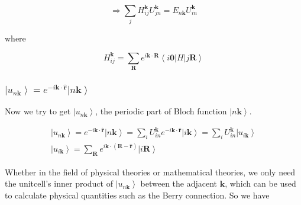 \begin{equation}
  \Rightarrow \sum_{j} H_{ij}^{\boldsymbol{k}} U_{jn}^{\boldsymbol{k}} = E_{n\boldsymbol{k}} U_{in}^{\boldsymbol{k}} 
\end{equation}

\noindent
where

\begin{equation}
  H_{ij}^{\boldsymbol{k}} = \sum_{\boldsymbol{R}} e^{i\boldsymbol{k} \cdot \boldsymbol{R}} \left\langle i \boldsymbol{0} \right| H \left| j \boldsymbol{R} \right\rangle
\end{equation}

\subsubsection{$\left| u_{n\boldsymbol{k}} \right\rangle = e^{-i\boldsymbol{k} \cdot \hat{\boldsymbol{r}}} \left| n\boldsymbol{k} \right\rangle$}

Now we try to get $\left| u_{n\boldsymbol{k}} \right\rangle$, the periodic part of Bloch function $\left| n\boldsymbol{k} \right\rangle$. 

\begin{equation}
  \begin{gathered}
    \left| u_{n\boldsymbol{k}} \right\rangle = e^{-i\boldsymbol{k} \cdot \hat{\boldsymbol{r}}} \left| n\boldsymbol{k} \right\rangle 
      = \sum_{i} U_{in}^{\boldsymbol{k}} e^{-i\boldsymbol{k} \cdot \hat{\boldsymbol{r}}} \left| i\boldsymbol{k} \right\rangle 
      = \sum_{i} U_{in}^{\boldsymbol{k}} \left| u_{i\boldsymbol{k}} \right\rangle \\
    \left| u_{i\boldsymbol{k}} \right\rangle 
      = \sum_{\boldsymbol{R}} e^{i\boldsymbol{k} \cdot (\boldsymbol{R} - \hat{\boldsymbol{r}})} \left| i\boldsymbol{R} \right\rangle 
  \end{gathered}
\end{equation}

Whether in the field of physical theories or mathematical theories, 
we only need the unitcell's inner product of $\left| u_{n\boldsymbol{k}} \right\rangle$ between the adjacent $\boldsymbol{k}$, 
which can be used to calculate physical quantities such as the Berry connection.
So we have

